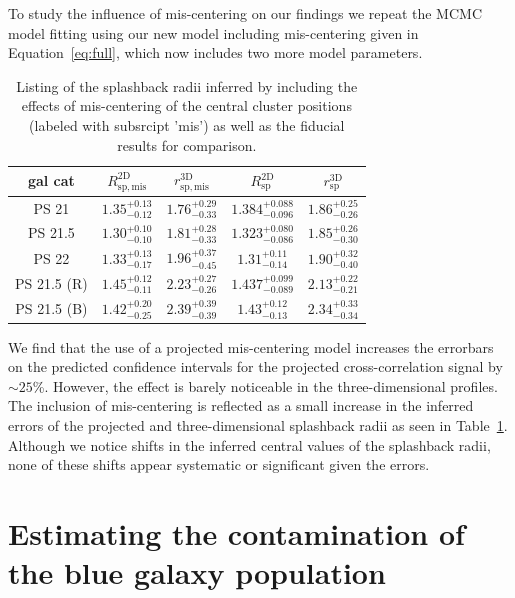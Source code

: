 \documentclass[iop, apjl, twocolappendix, numberedappendix]{emulateapj}
\begin{document}
To study the influence of mis-centering on our findings we repeat the
MCMC model fitting using our new model including mis-centering given
in Equation~\ref{eq:full}, which now includes two more model
parameters. 

\begin{table}
    \centering
    \caption{Listing of the splashback radii inferred by including the effects of mis-centering of the central cluster positions (labeled with subsrcipt 'mis') as well as the fiducial results for comparison.}
    \label{tab:mis_splash}
    \begin{tabular}{ccc|cc}
    \hline 
gal cat &  $R_{\mathrm{sp, mis}}^{\mathrm{2D}}$ & $r_{\mathrm{sp, mis}}^{\mathrm{3D}}$ &  $R_{\mathrm{sp}}^{\mathrm{2D}}$ & $r_{\mathrm{sp}}^{\mathrm{3D}}$\\
\hline 
\hline 
PS 21 &$1.35_{-0.12}^{+0.13}$ & $1.76_{-0.33}^{+0.29}$ & $1.384_{-0.096}^{+0.088}$ &$1.86_{-0.26}^{+0.25}$\\
\hline
PS 21.5 & $1.30_{-0.10}^{+0.10}$&$1.81_{-0.33}^{+0.28}$ & $1.323_{-0.086}^{+0.080}$&$1.85_{-0.30}^{+0.26}$\\
\hline
PS 22 &$1.33_{-0.17}^{+0.13}$ & $1.96_{-0.45}^{+0.37}$ & $1.31_{-0.14}^{+0.11}$ &$1.90_{-0.40}^{+0.32} $\\ 
\hline
PS 21.5 (R) & $1.45_{-0.11}^{+0.12}$ & $2.23_{-0.26}^{+0.27}$ & $1.437_{-0.089}^{+0.099}$ & $2.13_{-0.21}^{+0.22}$\\
\hline
PS 21.5 (B) & $1.42_{-0.25}^{+0.20}$ & $2.39_{-0.39}^{+0.39}$ & $1.43_{-0.13}^{+0.12}$ & $2.34_{-0.34}^{+0.33}$ \\
\hline
    \end{tabular} 
\end{table}

We find that the use of a projected mis-centering model increases the
errorbars on the predicted confidence intervals for the projected
cross-correlation signal by $\sim 25$\%. However, the effect is barely
noticeable in the three-dimensional profiles.  The inclusion of
mis-centering is reflected as a small increase in the inferred errors
of the projected and three-dimensional splashback radii as seen in
Table~\ref{tab:mis_splash}. Although we notice shifts in the inferred
central values of the splashback radii, none of these shifts appear
systematic or significant given the errors.

\section{Estimating the contamination of the blue galaxy population}
\label{sec:Errors}
\end{document}
